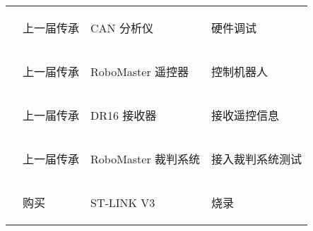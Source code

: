 \begin{longtable}{ X | X | X | X }
    \cline{2-4}

    &
        \begin{center}
            上一届传承
        \end{center}&
        \begin{center}
            CAN 分析仪
        \end{center}&
        \begin{center}
            硬件调试
        \end{center}\\

    \cline{2-4}

    &
        \begin{center}
            上一届传承
        \end{center}&
        \begin{center}
            RoboMaster 遥控器
        \end{center}&
        \begin{center}
            控制机器人
        \end{center}\\

    \cline{2-4}

    &
        \begin{center}
            上一届传承
        \end{center}&
        \begin{center}
            DR16 接收器
        \end{center}&
        \begin{center}
            接收遥控信息
        \end{center}\\

    \cline{2-4}

    &
        \begin{center}
            上一届传承
        \end{center}&
        \begin{center}
            RoboMaster 裁判系统
        \end{center}&
        \begin{center}
            接入裁判系统测试
        \end{center}\\

    \cline{2-4}

    &
        \begin{center}
            购买
        \end{center}&
        \begin{center}
            ST-LINK V3
        \end{center}&
        \begin{center}
            烧录
        \end{center}\\


\end{longtable}
